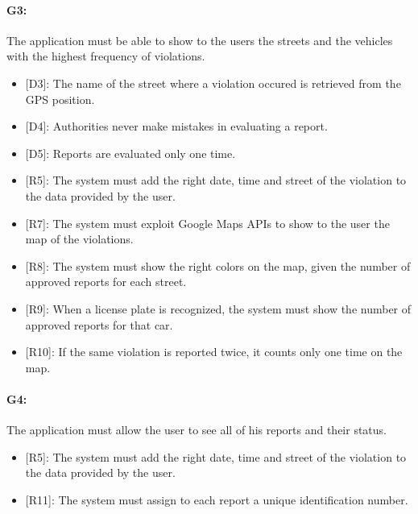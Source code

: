 \documentclass[12pt,a4paper]{report}
\begin{document}
			\paragraph {G3:} The application must be able to show to the users the streets and the vehicles with the highest frequency of violations.
			\begin{itemize}
				\item{[D3]:} The name of the street where a violation occured is retrieved from the GPS position.
				\item{[D4]:} Authorities never make mistakes in evaluating a report.
				\item{[D5]:} Reports are evaluated only one time.
			\end{itemize}
			\begin{itemize}
				\item{[R5]:} The system must add the right date, time and street of the violation to the data provided by the user.
				\item{[R7]:} The system must exploit Google Maps APIs to show to the user the map of the violations.
				\item{[R8]:} The system must show the right colors on the map, given the number of approved reports for each street.
				\item{[R9]:} When a license plate is recognized, the system must show the number of approved reports for that car.
				\item{[R10]:} If the same violation is reported twice, it counts only one time on the map.
			\end{itemize}
				\paragraph {G4:}  The application must allow the user to see all of his reports and their status.
			\begin{itemize}
				\item{[R5]:} The system must add the right date, time and street of the violation to the data provided by the user.
				\item{[R11]:} The system must assign to each report a unique identification number.
			\end{itemize}
\end{document}
